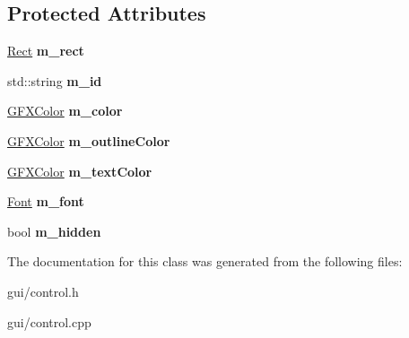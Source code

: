 \subsection*{Protected Attributes}
\begin{DoxyCompactItemize}
\item 
\hyperlink{classRect}{Rect} {\bfseries m\+\_\+rect}\hypertarget{classControl_a4f9c50c49ac9062273b2b883936f3607}{}\label{classControl_a4f9c50c49ac9062273b2b883936f3607}

\item 
std\+::string {\bfseries m\+\_\+id}\hypertarget{classControl_aad2890aa19203348ccaf282c2add2d1d}{}\label{classControl_aad2890aa19203348ccaf282c2add2d1d}

\item 
\hyperlink{structGFXColor}{G\+F\+X\+Color} {\bfseries m\+\_\+color}\hypertarget{classControl_af613b0d1634729d9f8b26c93240ef3c7}{}\label{classControl_af613b0d1634729d9f8b26c93240ef3c7}

\item 
\hyperlink{structGFXColor}{G\+F\+X\+Color} {\bfseries m\+\_\+outline\+Color}\hypertarget{classControl_a403fc50cfd7f293a85ec0200e752fc97}{}\label{classControl_a403fc50cfd7f293a85ec0200e752fc97}

\item 
\hyperlink{structGFXColor}{G\+F\+X\+Color} {\bfseries m\+\_\+text\+Color}\hypertarget{classControl_acb58c70ff0e286d7e4c98e41389ea1fb}{}\label{classControl_acb58c70ff0e286d7e4c98e41389ea1fb}

\item 
\hyperlink{classFont}{Font} {\bfseries m\+\_\+font}\hypertarget{classControl_addfbeffbc4faaee1e00509f8e6b724e5}{}\label{classControl_addfbeffbc4faaee1e00509f8e6b724e5}

\item 
bool {\bfseries m\+\_\+hidden}\hypertarget{classControl_acc0beadb9fa738b814929ef6bcdfa39a}{}\label{classControl_acc0beadb9fa738b814929ef6bcdfa39a}

\end{DoxyCompactItemize}


The documentation for this class was generated from the following files\+:\begin{DoxyCompactItemize}
\item 
gui/control.\+h\item 
gui/control.\+cpp\end{DoxyCompactItemize}
